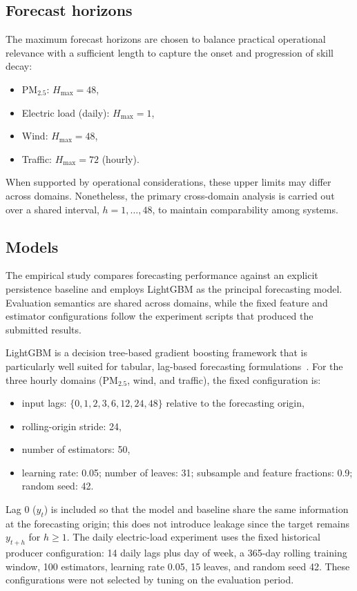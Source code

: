 \documentclass[pdflatex]{sn-jnl}
\begin{document}
\subsection{Forecast horizons}

The maximum forecast horizons are chosen to balance practical
operational relevance with a sufficient length to capture the onset and
progression of skill decay:
\begin{itemize}
  \item PM$_{2.5}$: $H_{\max}=48$,
  \item Electric load (daily): $H_{\max}=1$,
  \item Wind: $H_{\max}=48$,
  \item Traffic: $H_{\max}=72$ (hourly).
\end{itemize}
When supported by operational considerations, these upper limits may
differ across domains. Nonetheless, the primary cross-domain analysis
is carried out over a shared interval, $h=1,\ldots,48$, to maintain
comparability among systems.

\subsection{Models}

The empirical study compares forecasting performance against an
explicit persistence baseline and employs LightGBM as the principal
forecasting model. Evaluation semantics are shared across domains, while
the fixed feature and estimator configurations follow the experiment
scripts that produced the submitted results.

LightGBM is a decision tree-based gradient boosting framework that is
particularly well suited for tabular, lag-based forecasting
formulations~\citep{ke2017lightgbm}. For the three hourly domains
(PM$_{2.5}$, wind, and traffic), the fixed configuration is:
\begin{itemize}
  \item input lags: $\{0,1,2,3,6,12,24,48\}$ relative to the forecasting origin,
  \item rolling-origin stride: 24,
  \item number of estimators: 50,
  \item learning rate: 0.05; number of leaves: 31; subsample and feature
  fractions: 0.9; random seed: 42.
\end{itemize}
Lag 0 ($y_t$) is included so that the model and baseline share the same
information at the forecasting origin; this does not introduce leakage
since the target remains $y_{t+h}$ for $h \geq 1$.
The daily electric-load experiment uses the fixed historical producer
configuration: 14 daily lags plus day of week, a 365-day rolling training
window, 100 estimators, learning rate 0.05, 15 leaves, and random seed 42.
These configurations were not selected by tuning on the evaluation period.
\end{document}
